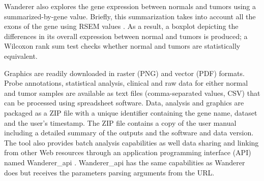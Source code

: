 \documentclass{bmcart}
\begin{document}
{\color{red}
Wanderer also explores the gene expression between normals and tumors using a summarized-by-gene value. {\color{red} Briefly, this summarization takes into account all the exons of the gene using RSEM values \cite{guo2013large}}. As a result, a boxplot depicting the differences in its overall expression between normal and tumors is produced; a Wilcoxon rank sum test checks whether normal and tumors are statistically equivalent.\\
}

Graphics are readily downloaded {\color{red} in raster (PNG) and vector (PDF) formats}. Probe annotations, statistical analysis, {\color{red} clinical} and raw data for either normal and tumor samples {\color{red} are available} as text files (comma-separated values, CSV) that can be processed using spreadsheet software. {\color{red} Data, analysis and graphics are packaged as a ZIP file with a unique identifier containing the gene name, dataset and the user's timestamp. The ZIP file contains a copy of the user manual including a detailed summary of the outputs and the software and data version.} \\

The tool also provides batch analysis capabilities as well data sharing and linking from other Web resources through an application programming interface (API) named Wanderer\_api \cite{wandererapi}. Wanderer\_api has the same capabilities as Wanderer does but receives the parameters parsing arguments from the URL.\\ 



\end{document}
